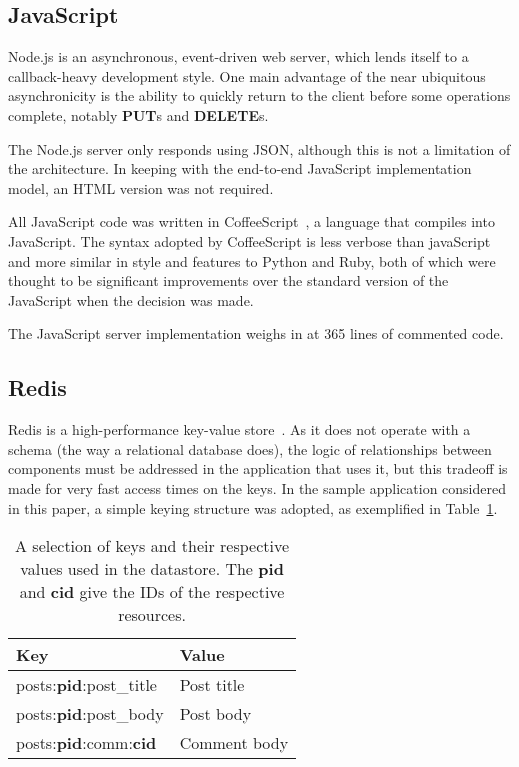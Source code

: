 \subsection{\label{sec:impl:js}JavaScript}

Node.js is an asynchronous, event-driven web server, which lends itself to a callback-heavy development style. One main advantage of the near ubiquitous asynchronicity is the ability to quickly return to the client before some operations complete, notably \textbf{PUT}s and \textbf{DELETE}s.

The Node.js server only responds using JSON, although this is not a limitation of the architecture. In keeping with the end-to-end JavaScript implementation model, an HTML version was not required.

All JavaScript code was written in CoffeeScript~\cite{coffee}, a language that compiles into JavaScript. The syntax adopted by CoffeeScript is less verbose than javaScript and more similar in style and features to Python and Ruby, both of which were thought to be significant improvements over the standard version of the JavaScript when the decision was made.

The JavaScript server implementation weighs in at 365 lines of commented code.

\subsection{\label{sec:impl:redis}Redis}

Redis is a high-performance key-value store~\cite{lerner2010}. As it does not operate with a schema (the way a relational database does), the logic of relationships between components must be addressed in the application that uses it, but this tradeoff is made for very fast access times on the keys. In the sample application considered in this paper, a simple keying structure was adopted, as exemplified in Table~\ref{tab:keys}.

\begin{table}
    \begin{center}
        \begin{tabular}{l l}
            \toprule
            \textbf{Key} & \textbf{Value} \\
            \midrule
            posts:\textbf{pid}:post\_title & Post title \\
            posts:\textbf{pid}:post\_body & Post body \\
            posts:\textbf{pid}:comm:\textbf{cid} & Comment body \\
            \bottomrule
        \end{tabular}
        \caption{A selection of keys and their respective values used in the datastore. The \textbf{pid} and \textbf{cid} give the IDs of the respective resources.}
        \label{tab:keys}
    \end{center}
\end{table}
